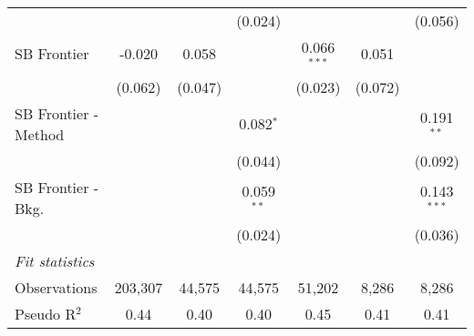 \begin{tabular}{lcccccc}
                        &               &              & (0.024)      &               &         & (0.056)\\   
   SB Frontier          & -0.020        & 0.058        &              & 0.066$^{***}$ & 0.051   &   \\   
                        & (0.062)       & (0.047)      &              & (0.023)       & (0.072) &   \\   
   SB Frontier - Method &               &              & 0.082$^{*}$  &               &         & 0.191$^{**}$\\   
                        &               &              & (0.044)      &               &         & (0.092)\\   
   SB Frontier - Bkg.   &               &              & 0.059$^{**}$ &               &         & 0.143$^{***}$\\   
                        &               &              & (0.024)      &               &         & (0.036)\\   
   \midrule
   \emph{Fit statistics}\\
   Observations         & 203,307       & 44,575       & 44,575       & 51,202        & 8,286   & 8,286\\  
   Pseudo R$^2$         & 0.44          & 0.40         & 0.40         & 0.45          & 0.41    & 0.41\\  
   

\end{tabular}
